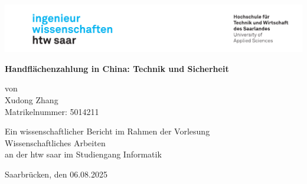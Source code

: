 \begin{titlepage}

\linespread{1.5}

\includegraphics[width=\linewidth]{graphics/htw_logo}

\begin{center}
    \large  
    \hfill
    \vfill
    \Large{\bfseries{Handflächenzahlung in China: Technik und Sicherheit}}
    
    von \\
    Xudong Zhang \\
    Matrikelnummer: 5014211\\

    \vfill
		
    Ein wissenschaftlicher Bericht im Rahmen der Vorlesung\\
    \glqq Wissenschaftliches Arbeiten\grqq\\
    an der htw saar im Studiengang Informatik\\
	
    \vfill	
    \vfill
	
    Saarbrücken, den 06.08.2025
\end{center}
    
\end{titlepage}
